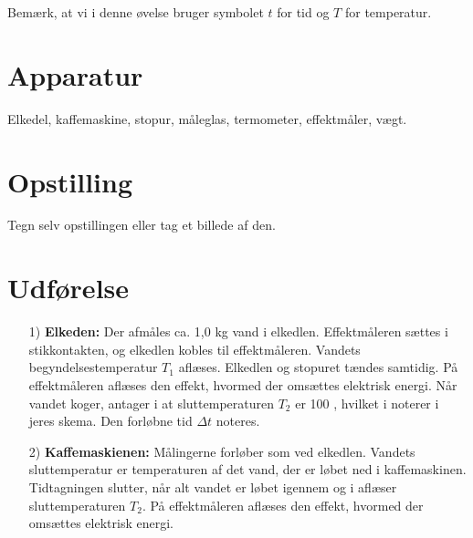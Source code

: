 Bemærk, at vi i denne øvelse bruger symbolet $t$ for tid og $T$ for temperatur.

\section{Apparatur}
Elkedel, kaffemaskine, stopur, måleglas, termometer, effektmåler, vægt.

\section{Opstilling}
Tegn selv opstillingen eller tag et billede af den.

\section{Udførelse}
\begin{itemize}
	\item[1)] {\bfseries Elkeden:}
	Der afmåles ca. 1,0 kg vand i elkedlen. Effektmåleren sættes i stikkontakten, og elkedlen kobles til effektmåleren. Vandets begyndelsestemperatur $T_{1}$ aflæses. Elkedlen og stopuret tændes samtidig. På effektmåleren aflæses den effekt, hvormed der omsættes elektrisk energi. Når vandet koger, antager i at sluttemperaturen $T_2$ er 100 \celsius, hvilket i noterer i jeres skema. Den forløbne tid $\Delta t$ noteres.
	\item[2)] {\bfseries Kaffemaskienen:}
	Målingerne forløber som ved elkedlen. Vandets sluttemperatur er temperaturen af det vand, der er løbet ned i kaffemaskinen. Tidtagningen slutter, når alt vandet er løbet igennem og i aflæser sluttemperaturen $T_2$. På effektmåleren aflæses den effekt, hvormed der omsættes elektrisk energi.
\end{itemize}

